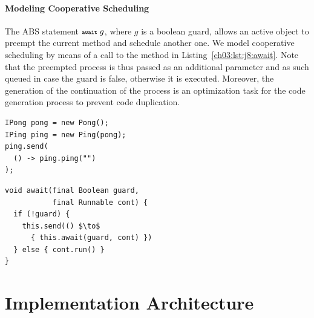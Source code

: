 \paragraph{Modeling Cooperative Scheduling}
The ABS statement $\textbf{\scriptsize\texttt{await}}\; g$, where $g$ is a boolean guard, allows an active object to preempt the current method and schedule another one.
We model cooperative scheduling by means of a call to the  method in Listing~\ref{ch03:lst:j8:await}.
Note that the preempted process is thus passed as an additional parameter and as such queued in case the guard is false,
otherwise it is executed.
Moreover, the generation of the continuation of the process is an optimization task for the code generation process to prevent code duplication.
\begin{center}
\begin{minipage}[t]{0.48\textwidth}
\begin{lstlisting}[mathescape,caption=main in ABS API,label=lst:main:api]
IPong pong = new Pong();
IPing ping = new Ping(pong);
ping.send(
  () -> ping.ping("")
);
\end{lstlisting}
\end{minipage}
\hfill
\begin{minipage}[t]{0.48\textwidth}
\begin{lstlisting}[mathescape,caption=Java~8 await implementation,label=lst:j8:await]
void await(final Boolean guard, 
           final Runnable cont) {
  if (!guard) { 
    this.send(() $\to$ 
      { this.await(guard, cont) })
  } else { cont.run() }
}
\end{lstlisting}
\end{minipage}
\end{center}





\section{Implementation Architecture}
\label{ch03:sec:impl:arch}

